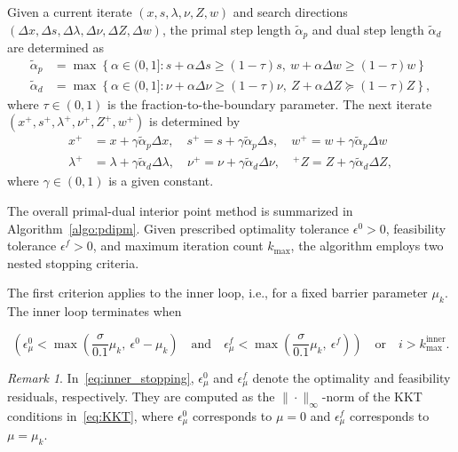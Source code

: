 \documentclass[]{interact}
\theoremstyle{plain}%
\theoremstyle{definition}
\theoremstyle{remark}
\newtheorem{remark}{Remark}
\begin{document}
Given a current iterate \( (x, s, \lambda, \nu, Z, w) \) and search directions  \( (\Delta x, \Delta s, \Delta \lambda, \Delta \nu, \Delta Z, \Delta w) \), the primal step length \(\tilde{\alpha}_p\) and dual step length \(\tilde{\alpha}_d\) are determined as
\begin{subequations}\label{eq:step_length_pd}
\begin{align}
\tilde{\alpha}_p &= \max \left\{ \alpha \in (0,1] : s + \alpha \Delta s \geq (1 - \tau)s,\ w + \alpha \Delta w \geq (1 - \tau)w \right\} \label{eq:step_length_primal} \\
\tilde{\alpha}_d &= \max \left\{ \alpha \in (0,1] : \nu + \alpha \Delta \nu \geq (1 - \tau)\nu,\ Z + \alpha \Delta Z \succeq (1 - \tau)Z \right\}, \label{eq:step_length_dual}
\end{align}
\end{subequations}
where \( \tau \in (0,1) \) is the fraction-to-the-boundary parameter.  The  next iterate \( (x^{+}, s^{+}, \lambda^{+}, \nu^{+}, Z^{+}, w^{+}) \) is determined by
    \begin{align*}
x^{+} & = x + \gamma \tilde{\alpha}_p \Delta x, \quad s^{+} = s + \gamma \tilde{\alpha}_p \Delta s, \quad w^{+} =  w + \gamma \tilde{\alpha}_p \Delta w \\[6pt]
\lambda^{+} & =  \lambda +\gamma  \tilde{\alpha}_d \Delta \lambda, \quad \nu^{+}  =  \nu + \gamma \tilde{\alpha}_d \Delta \nu, \quad ^{+}Z =  Z + \gamma \tilde{\alpha}_d \Delta Z,
\end{align*}
where  $\gamma \in (0,1)$ is a given constant. 

The overall primal-dual interior point method is summarized in Algorithm~\ref{algo:pdipm}. Given prescribed optimality tolerance \(\epsilon^0 > 0\), feasibility tolerance \(\epsilon^f > 0\), and maximum iteration count \(k_{\max}\), the algorithm employs two nested stopping criteria.

The first criterion applies to the inner loop, i.e., for a fixed barrier parameter \(\mu_k\). The inner loop terminates when

\begin{equation} \label{eq:inner_stopping}
\left( \epsilon_\mu^0 < \max\left(\frac{\sigma}{0.1} \mu_k, \ \epsilon^0 - \mu_k \right) \quad \text{and} \quad \epsilon_\mu^f < \max\left(\frac{\sigma}{0.1} \mu_k, \ \epsilon^f \right) \right) \quad \text{or} \quad i > k_{\max}^{\mathrm{inner}}.
\end{equation}

\begin{remark}\label{rem:opt_tol}
In~\eqref{eq:inner_stopping}, \(\epsilon_\mu^0\) and \(\epsilon_\mu^f\) denote the optimality and feasibility residuals, respectively. They are computed as the \(\|\cdot\|_\infty\)-norm of the KKT conditions in~\eqref{eq:KKT}, where \(\epsilon_\mu^0\) corresponds to \(\mu = 0\) and \(\epsilon_\mu^f\) corresponds to \(\mu = \mu_k\).
\end{remark}
\end{document}
